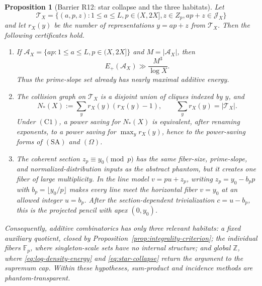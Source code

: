 \documentclass[11pt]{amsart}
\theoremstyle{plain}
\newtheorem{proposition}{Proposition}
\theoremstyle{remark}
\begin{document}
\begin{proposition}[Barrier R12: star collapse and the three habitats]
\label{prop:barrier-additive}
Let
\[
 \mathcal T_X=\{(a,p,z):1\leq a\leq L, p\in(X,2X],
 z\in Z_p, ap+z\in\mathcal J_X\}
\]
and let $r_X(y)$ be the number of representations $y=ap+z$ from
$\mathcal T_X$.  Then the following certificates hold.
\begin{enumerate}
\item If $\mathcal A_X=\{ap:1\leq a\leq L, p\in(X,2X]\}$ and
$M=|\mathcal A_X|$, then
\[
 E_+(\mathcal A_X)\gg \frac{M^3}{\log X}.
 \tag{8.12}\label{eq:log-density-energy}
\]
Thus the prime-slope set already has nearly maximal additive energy.
\item The collision graph on $\mathcal T_X$ is a disjoint union of
cliques indexed by $y$, and
\[
 N_*(X):=\sum_y r_X(y)(r_X(y)-1),\qquad
 \sum_y r_X(y)=|\mathcal T_X|.
 \tag{8.13}\label{eq:star-collapse}
\]
Under $(\mathrm C1)$, a power saving for $N_*(X)$ is equivalent, after
renaming exponents, to a power saving for $\max_y r_X(y)$, hence to the
power-saving forms of $(\mathrm{SA})$ and $(\Omega)$.
\item The coherent section $z_p\equiv y_0\pmod p$ has the same
fiber-size, prime-slope, and normalized-distribution inputs as the
abstract phantom, but it creates one fiber of large multiplicity.  In
the line model $v=pu+z_p$, writing
$z_p=y_0-b_pp$ with $b_p=\lfloor y_0/p\rfloor$ makes every line meet
the horizontal fiber $v=y_0$ at an allowed integer $u=b_p$.  After the
section-dependent trivialization $c=u-b_p$, this is the projected
pencil with apex $(0,y_0)$.
\end{enumerate}
Consequently, additive combinatorics has only three relevant habitats:
a fixed auxiliary quotient, closed by
Proposition~\ref{prop:integrality-criterion}; the individual fibers
$\mathbb F_p$, where singleton-scale sets have no internal structure;
and global $\mathbb Z$, where \eqref{eq:log-density-energy} and
\eqref{eq:star-collapse} return the argument to the supremum cap.
Within these hypotheses, sum-product and incidence methods are
phantom-transparent.
\end{proposition}
\end{document}

